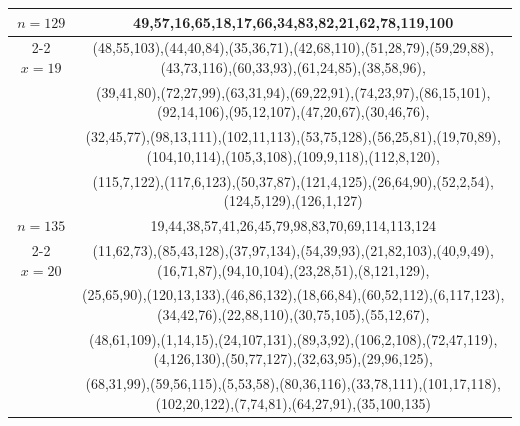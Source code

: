 \begin{tabular}{| c | c |}
\hline 
\(n=129\) & 
49,57,16,65,18,17,66,34,83,82,21,62,78,119,100\\
\cline{2-2}
\(x=19\)
&(48,55,103),(44,40,84),(35,36,71),(42,68,110),(51,28,79),(59,29,88),(43,73,116),(60,33,93),(61,24,85),(38,58,96),\\
&(39,41,80),(72,27,99),(63,31,94),(69,22,91),(74,23,97),(86,15,101),(92,14,106),(95,12,107),(47,20,67),(30,46,76),\\
&(32,45,77),(98,13,111),(102,11,113),(53,75,128),(56,25,81),(19,70,89),(104,10,114),(105,3,108),(109,9,118),(112,8,120),\\
&(115,7,122),(117,6,123),(50,37,87),(121,4,125),(26,64,90),(52,2,54),(124,5,129),(126,1,127)\\
\hline 
\(n=135\) & 
19,44,38,57,41,26,45,79,98,83,70,69,114,113,124\\
\cline{2-2}
\(x=20\)
&(11,62,73),(85,43,128),(37,97,134),(54,39,93),(21,82,103),(40,9,49),(16,71,87),(94,10,104),(23,28,51),(8,121,129),\\
&(25,65,90),(120,13,133),(46,86,132),(18,66,84),(60,52,112),(6,117,123),(34,42,76),(22,88,110),(30,75,105),(55,12,67),\\
&(48,61,109),(1,14,15),(24,107,131),(89,3,92),(106,2,108),(72,47,119),(4,126,130),(50,77,127),(32,63,95),(29,96,125),\\
&(68,31,99),(59,56,115),(5,53,58),(80,36,116),(33,78,111),(101,17,118),(102,20,122),(7,74,81),(64,27,91),(35,100,135)\\
\hline 
\end{tabular}